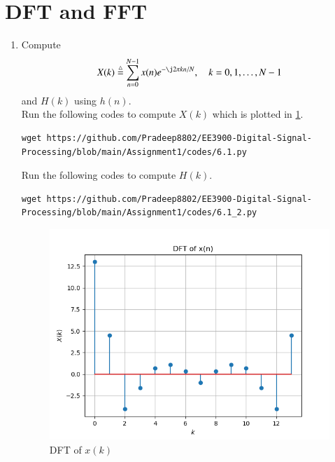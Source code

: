 \documentclass[journal,12pt,twocolumn]{IEEEtran}
\renewcommand\thesection{\arabic{section}}
\begin{document}
\section{DFT and FFT}
\begin{enumerate}[label=\thesection.\arabic*]
\item
Compute 
\begin{equation}
X(k) \define \sum _{n=0}^{N-1}x(n) e^{-\j2\pi kn/N}, \quad k = 0,1,\dots, N-1
\end{equation}
and $H(k)$ using $h(n)$.\\
\solution 
Run the following codes to compute $X(k)$ which is plotted in \ref{fig:6.1}.
\begin{lstlisting}
wget https://github.com/Pradeep8802/EE3900-Digital-Signal-Processing/blob/main/Assignment1/codes/6.1.py
\end{lstlisting}
Run the following codes to compute $H(k)$.
\begin{lstlisting}
wget https://github.com/Pradeep8802/EE3900-Digital-Signal-Processing/blob/main/Assignment1/codes/6.1_2.py
\end{lstlisting}
\begin{figure}[!ht]
	\centering
	\includegraphics[width=\columnwidth]{./figs/6.1_1.png}
	\caption{DFT of $x(k)$}
	\label{fig:6.1}
\end{figure}


\end{enumerate}
\end{document}
